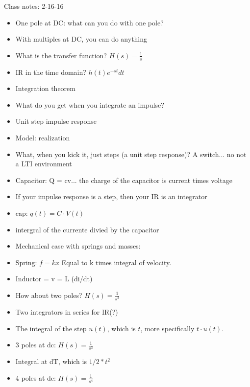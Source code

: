 Class notes: 2-16-16

\begin{itemize}
\item{One pole at DC: what can you do with one pole?}
\item{With multiples at DC, you can do anything}
\item{What is the transfer function? $H(s) = \frac{1}{s}$}
\item{IR in the time domain? $h(t)e^{-st}dt$}
\item{Integration theorem}
\item{What do you get when you integrate an impulse?}
\item{Unit step impulse response}
\item{Model: realization}
\item{What, when you kick it, just steps (a unit step response)? A switch... no not a LTI environment}
\item{Capacitor: Q = cv... the charge of the capacitor is current times voltage}
\item{If your impulse response is a step, then your IR is an integrator}


\item{cap: $q(t) = C \cdot V(t)$}
\item{intergral of the currente divied by the capacitor}


\item{Mechanical case with springs and masses:
}

\item{Spring: $f = kx$
    Equal to k times integral of velocity.
}

\item{
    Inductor = v = L (di/dt)
}

\item{
How about two poles? $H(s) = \frac{1}{s^2}$
}

\item{
Two integrators in series for IR(?)
}

\item{
The integral of the step $u(t)$, which is $t$, more specifically $t \cdot u(t)$. 
}

\item{
3 poles at dc: $H(s) = \frac{1}{s^3}$
}

\item{
Integral at dT, which is $1/2 * t^2$
}

\item{
4 poles at dc: $H(s) = \frac{1}{s^4}$
}


\end{itemize}
